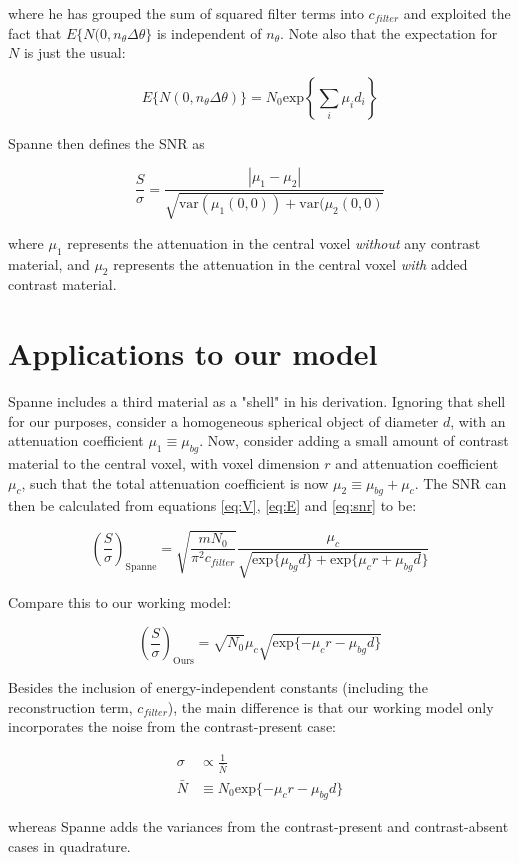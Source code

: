 \documentclass[11pt]{article}
\begin{document}
where he has grouped the sum of squared filter terms into \(c_{filter}\) and exploited the fact that $E\{N(0,n_{\theta}\Delta\theta\}$ is
independent of $n_{\theta}$. Note also that the expectation for \(N\) is just the usual:

\begin{equation}
        E\{N(0,n_{\theta}\Delta\theta)\} = N_0 \text{exp}\left\{\sum_i \mu_i d_i\right\} \label{eq:E}
\end{equation}  

Spanne then defines the SNR as


\begin{equation}
        \frac{S}{\sigma} = \frac{|\mu_1 - \mu_2|}{\sqrt{\text{var}(\mu_1(0,0)) + \text{var}(\mu_2(0,0)}} \label{eq:snr}
\end{equation}


where \(\mu_1\) represents the attenuation in the central voxel \textit{without} any contrast material, and \(\mu_2\) 
represents the attenuation in the central voxel \textit{with} added contrast material. 

\section{Applications to our model}
\label{sec:orgf0bee3c}

Spanne includes a third material as a "shell" in his derivation. Ignoring that shell for our purposes, 
consider a homogeneous spherical object of diameter \(d\), with an attenuation coefficient \(\mu_1 \equiv \mu_{bg}\). Now, consider 
adding a small amount of contrast material to the central voxel, with voxel dimension \(r\) and attenuation 
coefficient \(\mu_c\), such that the total attenuation coefficient is now \(\mu_2 \equiv \mu_{bg} + \mu_c\). The SNR can then be calculated 
from equations \ref{eq:V}, \ref{eq:E} and \ref{eq:snr} to be:


\begin{equation}
        \left(\frac{S}{\sigma}\right)_{\text{Spanne}} = \sqrt{\frac{mN_0}{\pi^2 c_{filter}}}\frac{\mu_c}{\sqrt{\text{exp}\{\mu_{bg} d \} + \text{exp}\{\mu_c r + \mu_{bg} d }\}}
\end{equation}


Compare this to our working model: 

\begin{equation}
        \left(\frac{S}{\sigma}\right)_{\text{Ours}} = \sqrt{N_0} \mu_c \sqrt{\text{exp}\{-\mu_c  r - \mu_{bg} d\}}
\end{equation}

Besides the inclusion of energy-independent constants (including the reconstruction term, \(c_{filter}\)), the main 
difference is that our working model only incorporates the noise from the contrast-present case:

\begin{align}
  \sigma  &\propto \frac{1}{\bar{N}} \\
  \bar{N} &\equiv N_0 \text{exp}\{-\mu_c r - \mu_{bg} d\}
\end{align}  

whereas Spanne adds the variances from the contrast-present and contrast-absent cases in quadrature. 
\end{document}
